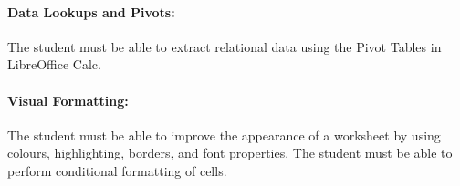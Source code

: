             \paragraph{Data Lookups and Pivots:}
                The student must be able to extract relational data using the
                Pivot Tables in LibreOffice Calc.

            \paragraph{Visual Formatting:}
                The student must be able to improve the appearance of a
                worksheet by using colours, highlighting, borders, and font
                properties. The student must be able to perform conditional
                formatting of cells.
